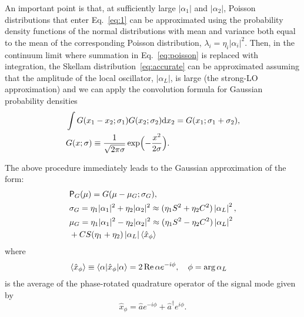 \documentclass[%
reprint,
superscriptaddress,
 amsmath,amssymb,amsfonts,
 aps,
 pra,
 longbibliography
]{revtex4-2}
\newcommand{\ket}[1]{\ensuremath{|{#1}\rangle}}
\newcommand{\bra}[1]{\ensuremath{\langle{#1}|}}
\newcommand{\avr}[1]{\ensuremath{\langle{#1}\rangle}}
\renewcommand{\Re}{\mathop{\rm Re}\nolimits}
\newcommand{\prob}{\mathsf{P}}
\newcommand{\dd}{\mathrm{d}}
\begin{document}
An important point is that,
at sufficiently large
$|\alpha_1|$ and $|\alpha_2|$,
Poisson distributions that enter Eq.~\eqref{eq:1}
can be approximated using
the probability density functions of the normal distributions
with mean and variance both equal to the mean of
the corresponding Poisson distribution, $\lambda_i=\eta_i |\alpha_i|^2$.
Then, in the continuum limit where
summation in Eq.~\eqref{eq:poisson} is replaced with integration,
the Skellam distribution~\eqref{eq:accurate}
can be approximated assuming
that the amplitude of the local oscillator, $\left|\alpha_L\right|$, is large
(the strong-LO approximation) and
we can apply the convolution formula
for Gaussian probability densities
\begin{align}
  &
  \label{eq:convolution}
  \int G(x_1-x_2;\sigma_1)G(x_2;\sigma_2)\dd
    x_2=G(x_1;\sigma_1+\sigma_2),
  \\
  &
    \label{eq:G-notation}
    G(x;\sigma)\equiv\frac{1}{\sqrt{2\pi\sigma}}\exp\Bigl(-\frac{x^2}{2\sigma}\Bigr).
\end{align}

The above procedure
immediately leads to the Gaussian approximation
of the form:
\begin{align}
  &
  \label{eq:Gaussian}
    \prob_G(\mu)=G(\mu-\mu_G;\sigma_G),
    \\
  &
    \label{eq:sigma_G}
    \sigma_G=\eta_1|\alpha_1|^2+\eta_2|\alpha_2|^2
    \approx
    (\eta_1S^2+\eta_2C^2) \left|\alpha_L\right|^2,
  \\
  &
    \label{eq:mu_G}
    \mu_G=\eta_1|\alpha_1|^2-\eta_2|\alpha_2|^2
    \approx
    (\eta_1S^2-\eta_2C^2) \left|\alpha_L\right|^2
    \notag
  \\
  &
    +CS (\eta_1+\eta_2) \left|\alpha_L\right| \avr{\hat{x}_\phi}
\end{align}
where
\begin{align}
  &
  \label{eq:avr-x-phi}
  \avr{\hat{x}_\phi}\equiv \bra{\alpha}\hat{x}_\phi\ket{\alpha}={2\Re\alpha e^{-i\phi}},
  \quad \phi=\arg\alpha_L
\end{align}
is the average of
the phase-rotated quadrature operator of the signal mode
given by
\begin{equation}
\hat{x}_\phi=\hat{a}e^{-i\phi}+\hat{a}^\dag e^{i\phi}.
    \label{eq:quad-op}
\end{equation}
\end{document}

